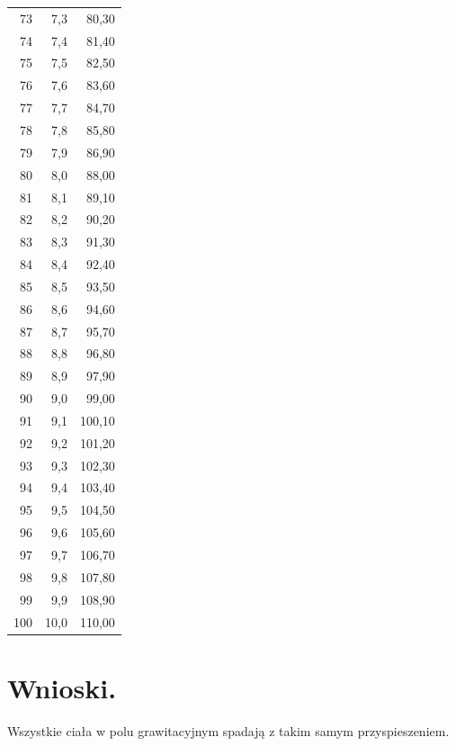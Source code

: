 \documentclass{article}
\begin{document}
\begin{longtable}{|r|r|r|}
        73 & 7,3 & 80,30 \\ 
        74 & 7,4 & 81,40 \\ 
        75 & 7,5 & 82,50 \\ 
        76 & 7,6 & 83,60 \\ 
        77 & 7,7 & 84,70 \\ 
        78 & 7,8 & 85,80 \\ 
        79 & 7,9 & 86,90 \\ 
        80 & 8,0 & 88,00 \\ 
        81 & 8,1 & 89,10 \\ 
        82 & 8,2 & 90,20 \\ 
        83 & 8,3 & 91,30 \\ 
        84 & 8,4 & 92,40 \\ 
        85 & 8,5 & 93,50 \\ 
        86 & 8,6 & 94,60 \\ 
        87 & 8,7 & 95,70 \\ 
        88 & 8,8 & 96,80 \\ 
        89 & 8,9 & 97,90 \\ 
        90 & 9,0 & 99,00 \\ 
        91 & 9,1 & 100,10 \\ 
        92 & 9,2 & 101,20 \\ 
        93 & 9,3 & 102,30 \\ 
        94 & 9,4 & 103,40 \\ 
        95 & 9,5 & 104,50 \\ 
        96 & 9,6 & 105,60 \\ 
        97 & 9,7 & 106,70 \\ 
        98 & 9,8 & 107,80 \\ 
        99 & 9,9 & 108,90 \\
        100 & 10,0 & 110,00 \\ 
        \hline
    \end{longtable}

\section{Wnioski.}

Wszystkie ciała w polu grawitacyjnym spadają z takim samym przyspieszeniem.
\end{document}
